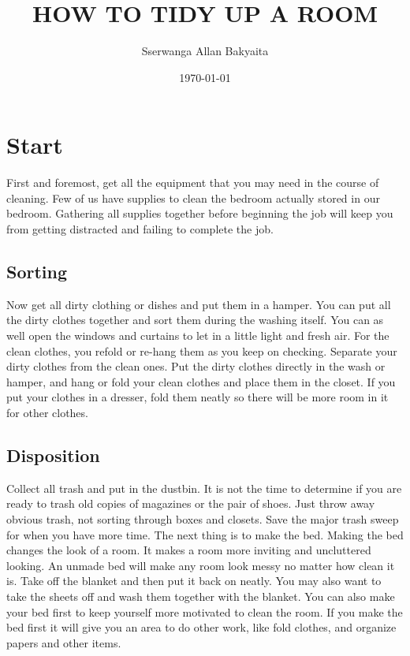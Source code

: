 \documentclass[a4paper,12pt]{article}
\begin{document}
\title{HOW TO TIDY UP A ROOM}
\author{Sserwanga Allan Bakyaita}
\date{\today}
\maketitle

\section {Start}
First and foremost, get all the equipment that you may need in the course of cleaning. Few of us have supplies to clean the bedroom actually stored in our bedroom. Gathering all supplies together before beginning the job will keep you from getting distracted and failing to complete the job.

\subsection {Sorting}
Now get all dirty clothing or dishes and put them in a hamper. You can put all the dirty clothes together and sort them during the washing itself. You can as well open the windows and curtains to let in a little light and fresh air. For the clean clothes, you refold or re-hang them as you keep on checking. Separate your dirty clothes from the clean ones. Put the dirty clothes directly in the wash or hamper, and hang or fold your clean clothes and place them in the closet. If you put your clothes in a dresser, fold them neatly so there will be more room in it for other clothes.

\subsection {Disposition}
Collect all trash and put in the dustbin. It is not the time to determine if you are ready to trash old copies of magazines or the pair of shoes. Just throw away obvious trash, not sorting through boxes and closets. Save the major trash sweep for when you have more time.
The next thing is to make the bed. Making the bed changes the look of a room. It makes a room more inviting and uncluttered looking. An unmade bed will make any room look messy no matter how clean it is. Take off the blanket and then put it back on neatly. You may also want to take the sheets off and wash them together with the blanket. You can also make your bed first to keep yourself more motivated to clean the room. If you make the bed first it will give you an area to do other work, like fold clothes, and organize papers and other items.
\end{document}
